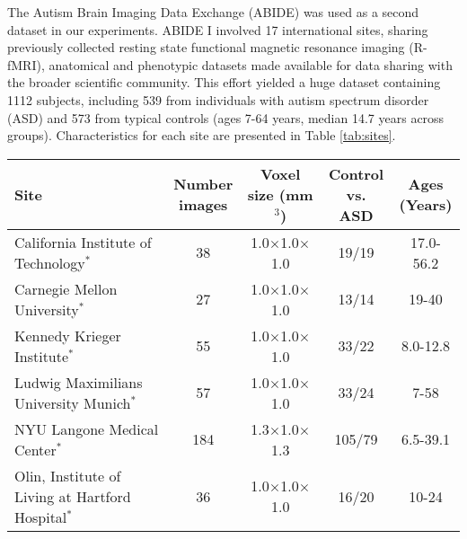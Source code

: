 \documentclass[twoside,fleqn,espcrc2]{elsarticle}
\begin{document}
The Autism Brain Imaging Data Exchange (ABIDE) \cite{di2014autism} was used as a second dataset in our experiments. ABIDE I involved 17 international sites, sharing previously collected resting state functional magnetic resonance imaging (R-fMRI), anatomical and phenotypic datasets made available for data sharing with the broader scientific community. This effort yielded a huge dataset containing 1112 subjects, including 539 from individuals with autism spectrum disorder (ASD) and 573 from typical controls (ages 7-64 years, median 14.7 years across groups). Characteristics for each site are presented in Table \ref{tab:sites}. 

\begin{table}[htb!]
\centering
\footnotesize
\begin{tabular}{lcccc}
\toprule
\addlinespace
\parbox{4.8cm}{\textbf{Site}} & 
\parbox{1.cm}{\textbf{Number \\ images}} &
\parbox{1.7cm}{\textbf{Voxel size \\ (mm$^3$) } }  &
\parbox{1.3cm}{\textbf{Control \\vs. ASD}}   &
\parbox{1.5cm}{\textbf{Ages \\(Years)}}\\
\midrule
\addlinespace
\parbox{4.8cm}{California Institute of Technology$^*$} & 
\parbox{1.cm}{38} &
\parbox{1.7cm}{1.0$\times$1.0$\times$1.0}   &
\parbox{1.3cm}{19/19}   &
\parbox{1.5cm}{17.0-56.2}\\
\addlinespace
\parbox{4.8cm}{Carnegie Mellon University$^*$} & 
\parbox{1.cm}{27} &
\parbox{1.7cm}{1.0$\times$1.0$\times$1.0}   &
\parbox{1.3cm}{13/14}    &
\parbox{1.5cm}{19-40}\\

\addlinespace
\parbox{4.8cm}{Kennedy Krieger Institute$^*$} & 
\parbox{1.cm}{55} &
\parbox{1.7cm}{1.0$\times$1.0$\times$1.0}   &
\parbox{1.3cm}{33/22}    &
\parbox{1.5cm}{8.0-12.8}\\

\addlinespace
\parbox{4.8cm}{Ludwig Maximilians 
University Munich$^*$} & 
\parbox{1.cm}{57} &
\parbox{1.7cm}{1.0$\times$1.0$\times$1.0}   &
\parbox{1.3cm}{33/24}    &
\parbox{1.5cm}{7-58}\\

\addlinespace
\parbox{4.8cm}{NYU Langone Medical Center$^*$} & 
\parbox{1.cm}{184} &
\parbox{1.7cm}{1.3$\times$1.0$\times$1.3}   &
\parbox{1.3cm}{105/79}    &
\parbox{1.5cm}{6.5-39.1}\\

\addlinespace
\parbox{4.8cm}{Olin, Institute of Living
at Hartford Hospital$^*$} & 
\parbox{1.cm}{36} &
\parbox{1.7cm}{1.0$\times$1.0$\times$1.0}   &
\parbox{1.3cm}{16/20}    &
\parbox{1.5cm}{10-24}\\


\end{tabular}
\end{table}
\end{document}
